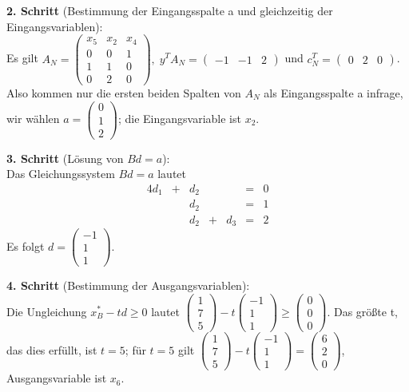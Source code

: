 \documentclass[10pt,a4paper,oneside,ngerman,numbers=noenddot]{scrartcl}
\begin{document}
		\textbf{2. Schritt} (Bestimmung der Eingangsspalte a und gleichzeitig der Eingangsvariablen):\\
		Es gilt $A_{N} = \begin{pmatrix} x_{5} & x_{2} & x_{4} \\ 0 & 0 & 1 \\ 1 & 1 & 0 \\ 0 & 2 & 0 \end{pmatrix},\; y^{T}A_{N} = \begin{pmatrix} -1 & -1 & 2 \end{pmatrix}$ und $c_{N}^{T} = \begin{pmatrix} 0 & 2 & 0\end{pmatrix}$. Also kommen nur die ersten beiden Spalten von $A_{N}$ als Eingangsspalte a infrage, wir wählen $a = \begin{pmatrix} 0 \\ 1 \\ 2 \end{pmatrix}$; die Eingangsvariable ist $x_{2}$.
		
		\textbf{3. Schritt} (Lösung von $Bd = a$):\\
		Das Gleichungssystem $Bd = a$ lautet
		\begin{alignat*}{4}
			d_{1} &+& d_{2} && &=& 0\\
			&& d_{2} && &=& 1 \\
			&& d_{2} &+& d_{3} &=& 2
		\end{alignat*}
		Es folgt $d = \begin{pmatrix} -1 \\ 1 \\ 1 \end{pmatrix}$.
		
		\textbf{4. Schritt} (Bestimmung der Ausgangsvariablen):\\
		Die Ungleichung $x_{B}^{*} - td \geq 0$ lautet $\begin{pmatrix} 1 \\ 7 \\ 5\end{pmatrix} - t \begin{pmatrix}-1 \\ 1 \\ 1 \end{pmatrix} \geq \begin{pmatrix} 0 \\ 0 \\ 0 \end{pmatrix}$. Das größte t, das dies erfüllt, ist $t = 5$; für $t = 5$ gilt $\begin{pmatrix} 1 \\ 7 \\ 5\end{pmatrix} - t \begin{pmatrix} -1 \\ 1 \\ 1 \end{pmatrix} = \begin{pmatrix} 6 \\ 2 \\ 0 \end{pmatrix}$, Ausgangsvariable ist $x_{6}$.
		
\end{document}
